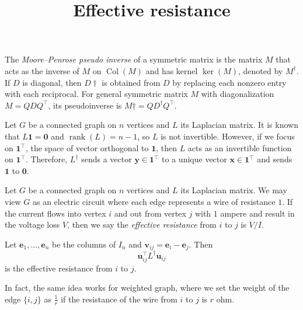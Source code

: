 \documentclass{article}
\title{Effective resistance}
\date{\vspace{-1cm}}
\newcommand{\trans}{^\top}
\newcommand{\bzero}{\mathbf{0}}
\newcommand{\bone}{\mathbf{1}}
\newcommand{\be}{\mathbf{e}}
\newcommand{\bx}{\mathbf{x}}
\newcommand{\by}{\mathbf{y}}
\newcommand{\bu}{\mathbf{u}}
\newcommand{\bv}{\mathbf{v}}
\newcommand{\rank}{\operatorname{rank}}
\newcommand{\Col}{\operatorname{Col}}
\theoremstyle{definition}
\begin{document}
\maketitle
\large

The \emph{Moore--Penrose pseudo inverse} of a symmetric matrix is the matrix $M$ that acts as the inverse of $M$ on $\Col(M)$ and has kernel $\ker(M)$, denoted by $M^\dagger$.  If $D$ is diagonal, then $D\dagger$ is obtained from $D$ by replacing each nonzero entry with each reciprocal.  For general symmetric matrix $M$ with diagonalization $M = QDQ\trans$, its pseudoinverse is $M\dagger = QD^\dagger Q\trans$.

Let $G$ be a connected graph on $n$ vertices and $L$ its Laplacian matrix.  It is known that $L\bone = \bzero$ and $\rank(L) = n-1$, so $L$ is not invertible.  However, if we focus on $\bone\trans$, the space of vector orthogonal to $\bone$, then $L$ acts as an invertible function on $\bone\trans$.  Therefore, $L^\dagger$ sends a vector $\by\in\bone\trans$ to a unique vector $\bx\in\bone\trans$ and sends $\bone$ to $\bzero$.  

Let $G$ be a connected graph on $n$ vertices and $L$ its Laplacian matrix.  We may view $G$ as an electric circuit where each edge represents a wire of resistance $1$.  If the current flows into vertex $i$ and out from vertex $j$ with $1$ ampere and result in the voltage loss $V$, then we say the \emph{effective resistance} from $i$ to $j$ is $V/I$.  

Let $\be_1,\ldots,\be_n$ be the columns of $I_n$ and $\bv_{ij} = \be_i - \be_j$.  Then 
\[\bu_{ij}\trans L^\dagger\bu_{ij}\]
is the effective resistance from $i$ to $j$.  

In fact, the same idea works for weighted graph, where we set the weight of the edge $\{i,j\}$ as $\frac{1}{r}$ if the resistance of the wire from $i$ to $j$ is $r$ ohm.
\end{document}
